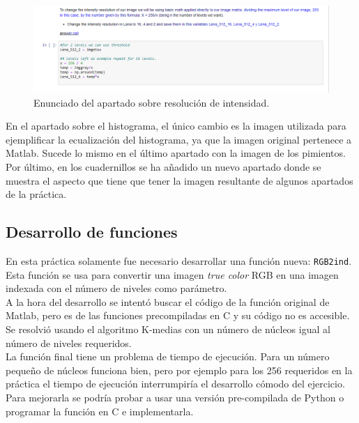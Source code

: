 \documentclass[a4paper,12pt]{report}
\begin{document}
\begin{figure}[h]
\centering
\includegraphics[width=1\textwidth]{imagenes/resolucionmatematica}
\caption{Enunciado del apartado sobre resolución de intensidad.}
\label{resmatematica}
\end{figure}

En el apartado sobre el histograma, el único cambio es la imagen utilizada para ejemplificar la ecualización del histograma, ya que la imagen original pertenece a Matlab. Sucede lo mismo en el último apartado con la imagen de los pimientos.\\

Por último, en los cuadernillos se ha añadido un nuevo apartado donde se muestra el aspecto que tiene que tener la imagen resultante de algunos apartados de la práctica.

\subsection{Desarrollo de funciones}

En esta práctica solamente fue necesario desarrollar una función nueva: \texttt{RGB2ind}. Esta función se usa para convertir una imagen \emph{true color} RGB en una imagen indexada con el número de niveles como parámetro. \\

A la hora del desarrollo se intentó buscar el código de la función original de Matlab, pero es de las funciones precompiladas en C y su código no es accesible. Se resolvió usando el algoritmo K-medias con un número de núcleos igual al número de niveles requeridos.\\

 La función final tiene un problema de tiempo de ejecución. Para un número pequeño de núcleos funciona bien, pero por ejemplo para los 256 requeridos en la práctica el tiempo de ejecución interrumpiría el desarrollo cómodo del ejercicio. Para mejorarla se podría probar a usar una versión pre-compilada de Python o programar la función en C e implementarla.\\
\end{document}
